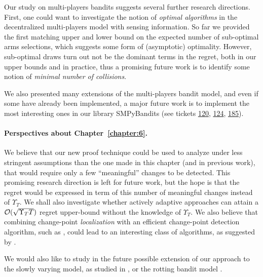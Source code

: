 Our study on multi-players bandits suggests several further research directions.
First, one could want to investigate the notion of \emph{optimal algorithms} in the decentralized multi-players model with sensing information. So far we provided the first matching upper and lower bound on the expected number of sub-optimal arms selections, which suggests some form of (asymptotic) optimality. However, sub-optimal draws turn out not be the dominant terms in the regret, both in our upper bounds and in practice, thus a promising future work is to identify some notion of \emph{minimal number of collisions}.

We also presented many extensions of the multi-players bandit model,
and even if some have already been implemented, a major future work is to implement the most interesting ones in our library SMPyBandits
(see tickets \href{https://github.com/SMPyBandits/SMPyBandits/issues/120}{120}, \href{https://github.com/SMPyBandits/SMPyBandits/issues/124}{124}, \href{https://github.com/SMPyBandits/SMPyBandits/issues/185}{185}).


\paragraph{Perspectives about \textbf{Chapter~\ref{chapter:6}}.}

We believe that our new proof technique could be used to analyze \GLRklUCB{} under less stringent assumptions than the one made in this chapter (and in previous work), that would require only a few ``meaningful'' changes to be detected. This promising research direction is left for future work,  but the hope is that the regret would be expressed in term of this number of meaningful changes instead of $\Upsilon_T$. We shall also investigate whether actively adaptive approaches can attain a $\mathcal{O}(\sqrt{\Upsilon_T T})$ regret upper-bound without the knowledge of $\Upsilon_T$.
We also believe that combining change-point \emph{localization} with an efficient change-point detection algorithm, such as \GLRklUCB, could lead to an interesting class of algorithms, as suggested by \cite{Maillard2018GLR}.

We would also like to study in the future possible extension of our approach to the slowly varying model, as studied in \cite{Besbes14stochastic,Louedec16,WeiSrivastava18Abruptly}, or the rotting bandit model \cite{Seznec2018}.


